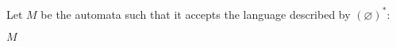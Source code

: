 Let $M$ be the automata such that it accepts the language described by $(\varnothing)^*$:
\begin{automata}{$M$}
	
	
\end{automata}